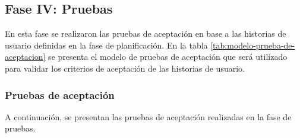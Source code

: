 \subsection{Fase IV: Pruebas}

En esta fase se realizaron las pruebas de aceptación en base a las historias de usuario definidas en la fase
de planificación. En la tabla \ref{tab:modelo-prueba-de-aceptacion} se presenta el modelo de pruebas de aceptación
que será utilizado para validar los criterios de aceptación de las historias de usuario.



\subsubsection{Pruebas de aceptación}

A continuación, se presentan las pruebas de aceptación realizadas en la fase de pruebas.

